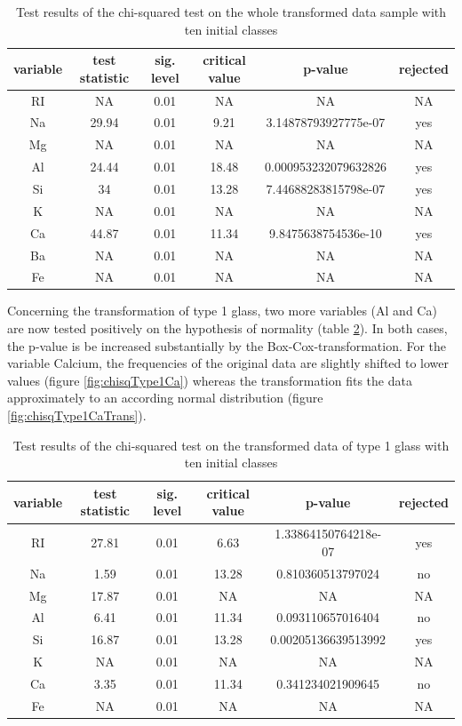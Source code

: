 \documentclass[a4paper, 12pt, titlepage, headsepline, listof = totoc, bibliography = totoc, numbers = noenddot]{scrartcl}
\begin{document}
\begin{table}[h!]
\centering
\begin{tabular}{|cccccc|} \hline variable & test statistic & sig. level & critical value & p-value & rejected\\ \hline RI & NA & 0.01 & NA & NA & NA\\ 
Na & 29.94 & 0.01 & 9.21 & 3.14878793927775e-07 & yes\\ 
Mg & NA & 0.01 & NA & NA & NA\\ 
Al & 24.44 & 0.01 & 18.48 & 0.000953232079632826 & yes\\ 
Si & 34 & 0.01 & 13.28 & 7.44688283815798e-07 & yes\\ 
K & NA & 0.01 & NA & NA & NA\\ 
Ca & 44.87 & 0.01 & 11.34 & 9.8475638754536e-10 & yes\\ 
Ba & NA & 0.01 & NA & NA & NA\\ 
Fe & NA & 0.01 & NA & NA & NA\\ \hline \end{tabular}\caption{Test results of the chi-squared test on the whole transformed data sample with ten initial classes}
\label{tab:chi-full-trans}
\end{table}

Concerning the transformation of type 1 glass, two more variables (Al and Ca) are now tested positively on the hypothesis of normality (table \ref{tab:chi-type1-trans}). In both cases, the p-value is be increased substantially by the Box-Cox-transformation. For the variable Calcium, the frequencies of the original data are slightly shifted to lower values (figure \ref{fig:chisqType1Ca}) whereas the transformation fits the data approximately to an according normal distribution (figure \ref{fig:chisqType1CaTrans}).

\begin{table}[h!]
\centering
\begin{tabular}{|cccccc|} \hline variable & test statistic & sig. level & critical value & p-value & rejected\\ \hline RI & 27.81 & 0.01 & 6.63 & 1.33864150764218e-07 & yes\\ 
Na & 1.59 & 0.01 & 13.28 & 0.810360513797024 & no\\ 
Mg & 17.87 & 0.01 & NA & NA & NA\\ 
Al & 6.41 & 0.01 & 11.34 & 0.093110657016404 & no\\ 
Si & 16.87 & 0.01 & 13.28 & 0.00205136639513992 & yes\\ 
K & NA & 0.01 & NA & NA & NA\\ 
Ca & 3.35 & 0.01 & 11.34 & 0.341234021909645 & no\\ 
Fe & NA & 0.01 & NA & NA & NA\\ \hline \end{tabular}\caption{Test results of the chi-squared test on the transformed data of type 1 glass with ten initial classes}
\label{tab:chi-type1-trans}
\end{table}
\end{document}
